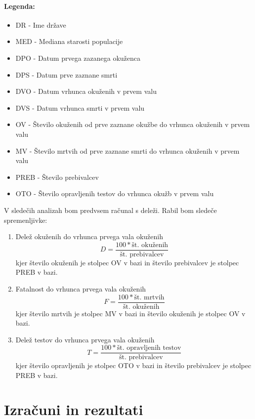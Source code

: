 \documentclass[a4paper,11pt]{article}
\begin{document}
\paragraph{Legenda:}

\begin{itemize}
\item{DR - Ime države}
\item{MED - Mediana starosti populacije}
\item{DPO - Datum prvega zazanega okuženca}
\item{DPS - Datum prve zaznane smrti}
\item{DVO - Datum vrhunca okuženih v prvem valu}
\item{DVS - Datum vrhunca smrti v prvem valu}
\item{OV - Število okuženih od prve zaznane okužbe do vrhunca okuženih v prvem valu}
\item{MV - Število mrtvih od prve zaznane smrti do vrhunca okuženih v prvem valu}
\item{PREB - Število prebivalcev}
\item{OTO - Število opravljenih testov do vrhunca okužb v prvem valu}
\end{itemize}

V sledečih analizah bom predvsem računal s deleži. Rabil bom sledeče spremenljivke:
\begin{enumerate}
\item{Delež okuženih do vrhunca prvega vala okuženih}
\[D = \frac{100 * \text{št. okuženih}}{\text{št. prebivalcev}}\]
kjer število okuženih je stolpec OV v bazi in število prebivalcev je stolpec PREB v bazi.

\item{Fatalnost do vrhunca prvega vala okuženih}
\[F = \frac{100 * \text{št. mrtvih}}{\text{št. okuženih}}\]
kjer število mrtvih je stolpec MV v bazi in število okuženih je stolpec OV v bazi.

\item{Delež testov do vrhunca prvega vala okuženih}
\[T = \frac{100 * \text{št. opravljenih testov}}{\text{št. prebivalcev}}\]
kjer število opravljenih je stolpec OTO v bazi in število prebivalcev je stolpec PREB v bazi.

\end{enumerate}

\section{Izračuni in rezultati}
\end{document}
